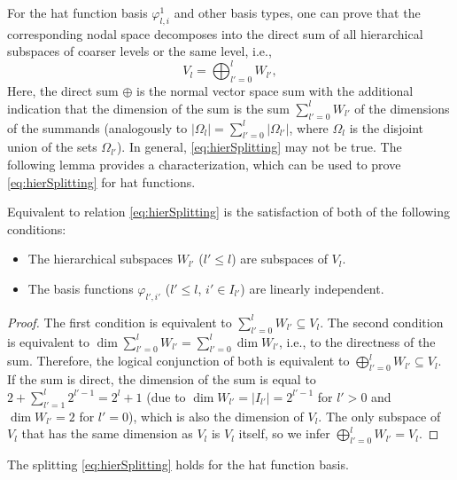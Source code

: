 For the hat function basis $\varphi_{l,i}^1$ and other basis types,
one can prove that the corresponding nodal space
decomposes into the direct sum of all
hierarchical subspaces of coarser levels or the same level, i.e.,
\begin{equation}
  \label{eq:hierSplitting}
  V_l
  = \bigoplus_{l'=0}^l W_{l'},
\end{equation}
Here, the direct sum $\oplus$ is
the normal vector space sum with the additional indication
that the dimension of the sum is the sum $\sum_{l'=0}^l W_{l'}$
of the dimensions of the summands
(analogously to $|\Omega_l| = \sum_{l'=0}^l |\Omega_{l'}|$,
where $\Omega_l$ is the disjoint union of the sets $\Omega_{l'}$).
In general, \eqref{eq:hierSplitting} may not be true.
The following lemma provides a characterization,
which can be used to prove \eqref{eq:hierSplitting} for hat functions.
\begin{lemma}
  \label{lemma:hierSplitting}
  Equivalent to relation \eqref{eq:hierSplitting} is the satisfaction of
  both of the following conditions:
  \begin{itemize}
    \item
    The hierarchical subspaces $W_{l'}$ ($l' \le l$) are subspaces of $V_l$.
    
    \item
    The basis functions $\varphi_{l',i'}$ ($l' \le l$, $i' \in I_{l'}$)
    are linearly independent.
  \end{itemize}
\end{lemma}
\begin{proof}
  The first condition is equivalent to $\sum_{l'=0}^l W_{l'} \subseteq V_l$.
  The second condition is equivalent to
  $\dim \sum_{l'=0}^l W_{l'} = \sum_{l'=0}^l \dim W_{l'}$,
  i.e., to the directness of the sum.
  Therefore, the logical conjunction of both is equivalent to
  $\bigoplus_{l'=0}^l W_{l'} \subseteq V_l$.
  If the sum is direct,
  the dimension of the sum is equal to $2 + \sum_{l'=1}^l 2^{l'-1} = 2^l + 1$
  (due to $\dim W_{l'} = |I_{l'}| = 2^{l'-1}$ for $l' > 0$ and
  $\dim W_{l'} = 2$ for $l' = 0$),
  which is also the dimension of $V_l$.
  The only subspace of $V_l$ that has the same dimension as $V_l$ is $V_l$ itself,
  so we infer $\bigoplus_{l'=0}^l W_{l'} = V_l$.
\end{proof}
\begin{corollary}
  The splitting \eqref{eq:hierSplitting} holds for the hat function basis.
\end{corollary}
